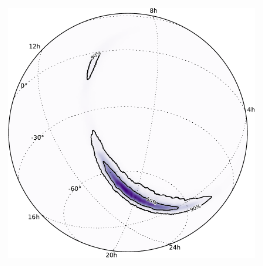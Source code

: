 \documentclass[aspectratio=169]{beamer}
\begin{document}
\begin{frame}
\begin{columns}
        \includegraphics[width=0.49\textwidth]{figures/ligo_lambert-skymap.pdf}
    \end{columns}
\end{frame}
\end{document}
